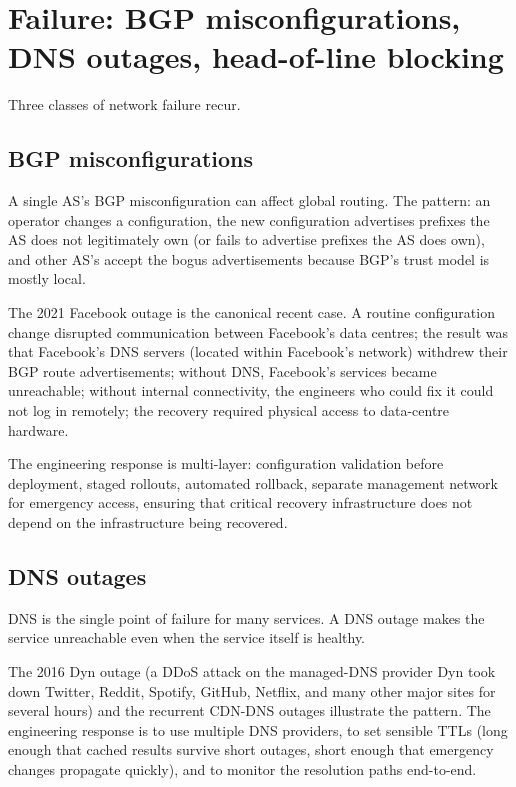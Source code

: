 \section{Failure: BGP misconfigurations, DNS outages, head-of-line blocking}

Three classes of network failure recur.

\subsection{BGP misconfigurations}

A single AS's BGP misconfiguration can affect global routing. The pattern: an operator changes a configuration, the new configuration advertises prefixes the AS does not legitimately own (or fails to advertise prefixes the AS does own), and other AS's accept the bogus advertisements because BGP's trust model is mostly local.

The 2021 Facebook outage is the canonical recent case. A routine configuration change disrupted communication between Facebook's data centres; the result was that Facebook's DNS servers (located within Facebook's network) withdrew their BGP route advertisements; without DNS, Facebook's services became unreachable; without internal connectivity, the engineers who could fix it could not log in remotely; the recovery required physical access to data-centre hardware.

The engineering response is multi-layer: configuration validation before deployment, staged rollouts, automated rollback, separate management network for emergency access, ensuring that critical recovery infrastructure does not depend on the infrastructure being recovered.

\subsection{DNS outages}

DNS is the single point of failure for many services. A DNS outage makes the service unreachable even when the service itself is healthy.

The 2016 Dyn outage (a DDoS attack on the managed-DNS provider Dyn took down Twitter, Reddit, Spotify, GitHub, Netflix, and many other major sites for several hours) and the recurrent CDN-DNS outages illustrate the pattern. The engineering response is to use multiple DNS providers, to set sensible TTLs (long enough that cached results survive short outages, short enough that emergency changes propagate quickly), and to monitor the resolution paths end-to-end.

